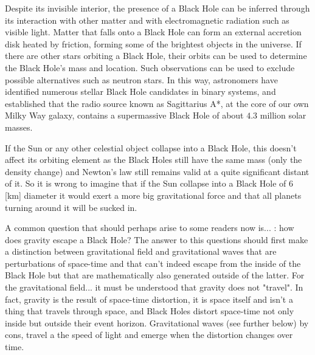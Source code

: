 	Despite its invisible interior, the presence of a Black Hole can be inferred through its interaction with other matter and with electromagnetic radiation such as visible light. Matter that falls onto a Black Hole can form an external accretion disk heated by friction, forming some of the brightest objects in the universe. If there are other stars orbiting a Black Hole, their orbits can be used to determine the Black Hole's mass and location. Such observations can be used to exclude possible alternatives such as neutron stars. In this way, astronomers have identified numerous stellar Black Hole candidates in binary systems, and established that the radio source known as Sagittarius A*, at the core of our own Milky Way galaxy, contains a supermassive Black Hole of about $4.3$ million solar masses. 
	\begin{tcolorbox}[title=Remark,colframe=black,arc=10pt]
	If the Sun or any other celestial object collapse into a Black Hole, this doesn't affect its orbiting element as the Black Holes still have the same mass (only the density change) and Newton's law still remains valid at a quite significant distant of it. So it is wrong to imagine that if the Sun collapse into a Black Hole of $6$ [km] diameter it would exert a more big gravitational force and that all planets turning around it will be sucked in.
	\end{tcolorbox}
	A common question that should perhaps arise to some readers now is... : how does gravity escape a Black Hole? The answer to this questions should first make a distinction between gravitational field and gravitational waves that are perturbations of space-time and that can't indeed escape from the inside of the Black Hole but that are mathematically also generated outside of the latter. For the gravitational field... it must be understood that gravity does not "travel". In fact, gravity is the result of space-time distortion, it is space itself and isn't a thing that travels through space, and Black Holes distort space-time not only inside but outside their event horizon. Gravitational waves (see further below) by cons, travel a the speed of light and emerge when the distortion changes over time.
	
